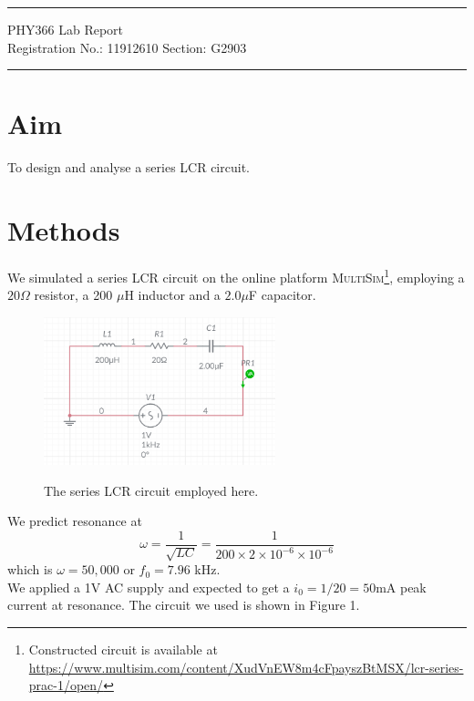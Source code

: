 \documentclass{article}
\begin{document}
	
	\author{Aayush Arya}
	\date{August 28, 2021}
	\title{}
	
	\maketitle
	
	\hrule
	\begin{center}
		PHY366 Lab Report\\
		Registration No.: 11912610 \quad Section: G2903
	\end{center}
	\hrule

	\section*{Aim}
	To design and analyse a series LCR circuit.
	
	\section*{Methods}
	
	We simulated a series LCR circuit on the online platform \textsc{MultiSim}\footnote{Constructed circuit is available at \url{https://www.multisim.com/content/XudVnEW8m4cFpayszBtMSX/lcr-series-prac-1/open/}}, employing a $20\Omega$ resistor, a 200 $\mu$H inductor and a $2.0\mu$F capacitor.
	
	\begin{figure}[h]
		\centering
		\includegraphics[width=0.6\textwidth]{../circuit}
		\label{fig:circuit}
		\caption{The series LCR circuit employed here.}
	\end{figure}

	We predict resonance at
	$$ \omega = \frac{1}{\sqrt{LC}} = \frac{1}{200\times2\times10^{-6}\times 10^{-6}} $$
	which is $\omega = 50,000$ or $f_0 = 7.96$ kHz.\\
	
	We applied a 1V AC supply and expected to get a $i_0 = 1/20 = 50$mA peak current at resonance. The circuit we used is shown in Figure 1.
	
\end{document}
